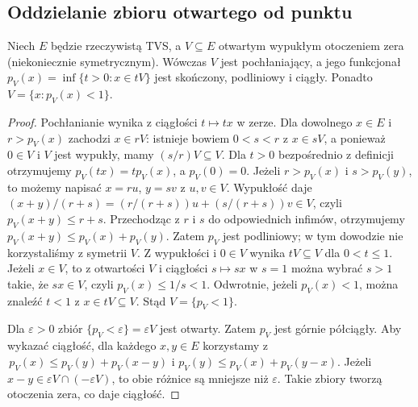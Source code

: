 \subsection{Oddzielanie zbioru otwartego od punktu}

\begin{lemat}\label{lem:open-gauge}
Niech $E$ będzie rzeczywistą TVS, a $V\subseteq E$ otwartym
wypukłym otoczeniem zera (niekoniecznie symetrycznym).
Wówczas $V$ jest pochłaniający, a jego funkcjonał
$p_V(x)=\inf\{t>0:x\in tV\}$ jest skończony, podliniowy i ciągły.
Ponadto $V=\{x:p_V(x)<1\}$.
\end{lemat}
\begin{proof}
Pochłanianie wynika z ciągłości $t\mapsto tx$ w zerze.
Dla dowolnego $x\in E$ i $r>p_V(x)$ zachodzi $x\in rV$:
istnieje bowiem $0<s<r$ z $x\in sV$, a ponieważ $0\in V$
i $V$ jest wypukły, mamy $(s/r)V\subseteq V$.
Dla $t>0$ bezpośrednio z definicji otrzymujemy
$p_V(tx)=t p_V(x)$, a $p_V(0)=0$. Jeżeli
$r>p_V(x)$ i $s>p_V(y)$, to możemy napisać
$x=ru$, $y=sv$ z $u,v\in V$. Wypukłość daje
$(x+y)/(r+s)=(r/(r+s))u+(s/(r+s))v\in V$,
czyli $p_V(x+y)\le r+s$. Przechodząc z $r$ i $s$
do odpowiednich infimów, otrzymujemy
$p_V(x+y)\le p_V(x)+p_V(y)$. Zatem $p_V$ jest
podliniowy; w tym dowodzie nie korzystaliśmy z symetrii $V$.
Z wypukłości i $0\in V$ wynika
$tV\subseteq V$ dla $0<t\le1$. Jeżeli $x\in V$, to
z otwartości $V$ i ciągłości $s\mapsto sx$ w $s=1$
można wybrać $s>1$ takie, że $sx\in V$, czyli
$p_V(x)\le1/s<1$. Odwrotnie, jeżeli $p_V(x)<1$,
można znaleźć $t<1$ z $x\in tV\subseteq V$.
Stąd $V=\{p_V<1\}$.

Dla $\varepsilon>0$ zbiór $\{p_V<\varepsilon\}=\varepsilon V$
jest otwarty. Zatem $p_V$ jest górnie półciągły. Aby
wykazać ciągłość, dla każdego $x,y\in E$ korzystamy z
$\,p_V(x)\le p_V(y)+p_V(x-y)$ i
$p_V(y)\le p_V(x)+p_V(y-x)$.
Jeżeli $x-y\in\varepsilon V\cap(-\varepsilon V)$,
to obie różnice są mniejsze niż $\varepsilon$.
Takie zbiory tworzą otoczenia zera, co daje ciągłość.
\end{proof}

